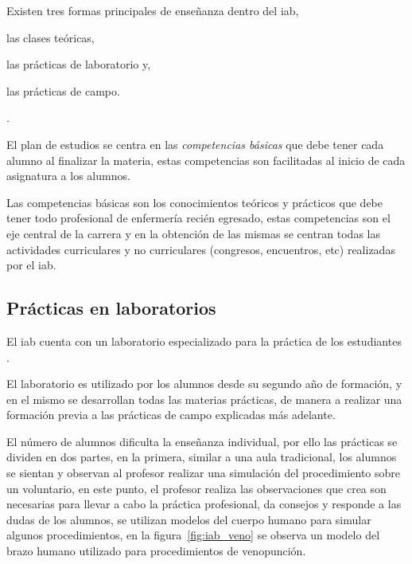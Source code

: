 Existen tres formas principales de enseñanza dentro del \Gls{iab}, 
\begin{enumerate*}[label=\itshape\alph*\upshape.]
\item las clases teóricas, 
\item las prácticas de laboratorio y, 
\item las prácticas de campo.
\end{enumerate*}.

El plan de estudios se centra en las \emph{competencias básicas} que debe tener
cada alumno al finalizar la materia, estas competencias son facilitadas al
inicio de cada asignatura a los alumnos.

Las competencias básicas son los conocimientos teóricos y prácticos que debe
tener todo profesional de enfermería recién egresado, estas competencias son el
eje central de la carrera y en la obtención de las mismas se centran todas las
actividades curriculares y no curriculares (congresos, encuentros, etc)
realizadas por el \Gls{iab}.



\subsection{Prácticas en laboratorios}
\label{sec:practica_lab}

El \Gls{iab} cuenta con un laboratorio especializado para la práctica de los
estudiantes .

El laboratorio es utilizado por los alumnos desde su segundo año de formación, y
en el mismo se desarrollan todas las materias prácticas, de manera a realizar
una formación previa a las prácticas de campo explicadas más adelante.

El número de alumnos dificulta la enseñanza individual, por ello las prácticas se
dividen en dos partes, en la primera, similar a una aula tradicional, los
alumnos se sientan y observan al profesor realizar una simulación del
procedimiento sobre un voluntario, en este punto, el profesor realiza las
observaciones que crea son necesarias para llevar a cabo la práctica
profesional, da consejos y responde a las dudas de los alumnos,
se utilizan modelos del cuerpo humano para simular
algunos procedimientos, en la figura~\ref{fig:iab_veno} se observa un modelo del
brazo humano utilizado para procedimientos de venopunción.

